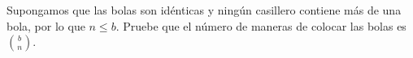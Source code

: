 \begin{statement}{4}
  Supongamos que las bolas son id\'enticas y ning\'un casillero contiene m\'as de una bola,
  por lo que $n \leq b$.
  Pruebe que el n\'umero de maneras de colocar las bolas es $\binom{b}{n}$.
\end{statement}